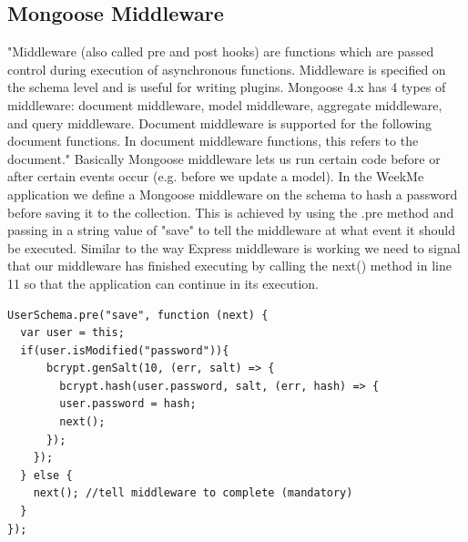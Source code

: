 \documentclass[11pt]{article}
\begin{document}
\subsection{Mongoose Middleware}
"Middleware (also called pre and post hooks) are functions which are passed control during execution of asynchronous functions. Middleware is specified on the schema level and is useful for writing plugins. Mongoose 4.x has 4 types of middleware: document middleware, model middleware, aggregate middleware, and query middleware. Document middleware is supported for the following document functions. In document middleware functions, this refers to the document." \cite{mongoosemiddleware} Basically Mongoose middleware lets us run certain code before or after certain events occur (e.g. before we update a model). In the WeekMe application we define a Mongoose middleware on the schema to hash a password before saving it to the collection. This is achieved by using the .pre method and passing in a string value of "save" to tell the middleware at what event it should be executed. Similar to the way Express middleware is working we need to signal that our middleware has finished executing by calling the next() method in line 11 so that the application can continue in its execution. 

\begin{lstlisting}
UserSchema.pre("save", function (next) {
  var user = this;
  if(user.isModified("password")){ 
      bcrypt.genSalt(10, (err, salt) => { 
        bcrypt.hash(user.password, salt, (err, hash) => {
        user.password = hash;
        next();
      });
    });
  } else {
    next(); //tell middleware to complete (mandatory)
  }
});
\end{lstlisting}
\end{document}
